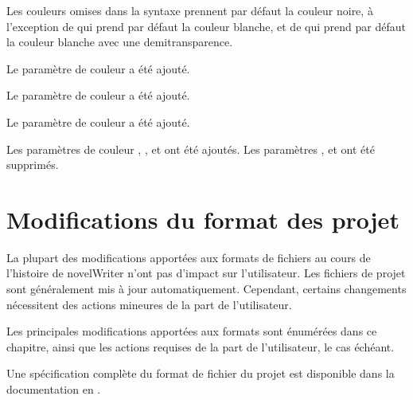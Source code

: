 \documentclass[a4paper,11pt,french]{sphinxmanual}
\begin{document}
\sphinxAtStartPar
Les couleurs omises dans la syntaxe prennent par défaut la couleur noire, à l’exception de  qui prend par défaut la couleur blanche, et de  qui prend par défaut la couleur blanche avec une demi\sphinxhyphen{}transparence.

\sphinxAtStartPar
{}Le paramètre de couleur  a été ajouté.

\sphinxAtStartPar
{}Le paramètre de couleur  a été ajouté.

\sphinxAtStartPar
{}Le paramètre de couleur  a été ajouté.

\sphinxAtStartPar
{}Les paramètres de couleur  , ,  et  ont été ajoutés. Les paramètres ,  et  ont été supprimés.

\sphinxstepscope


\chapter{Modifications du format des projet}
\label{\detokenize{more_projectformat:project-format-changes}}\label{\detokenize{more_projectformat:a-prjfmt}}\label{\detokenize{more_projectformat::doc}}
\sphinxAtStartPar
La plupart des modifications apportées aux formats de fichiers au cours de l’histoire de novelWriter n’ont pas d’impact sur l’utilisateur. Les fichiers de projet sont généralement mis à jour automatiquement. Cependant, certains changements nécessitent des actions mineures de la part de l’utilisateur.

\sphinxAtStartPar
Les principales modifications apportées aux formats sont énumérées dans ce chapitre, ainsi que les actions requises de la part de l’utilisateur, le cas échéant.

\sphinxAtStartPar
Une spécification complète du format de fichier du projet est disponible dans la documentation en .
\end{document}
